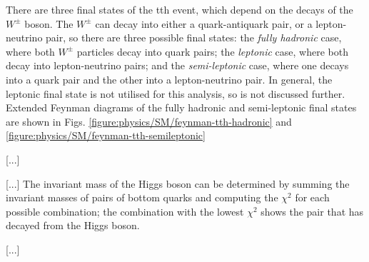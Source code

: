 There are three final states of the tth event, which depend on the decays of the $W^\pm$ boson. The $W^\pm$ can decay into either a quark-antiquark pair, or a lepton-neutrino pair, so there are three possible final states: the \emph{fully hadronic} case, where both $W^\pm$ particles decay into quark pairs; the \emph{leptonic} case, where both decay into lepton-neutrino pairs; and the \emph{semi-leptonic} case, where one decays into a quark pair and the other into a lepton-neutrino pair. In general, the leptonic final state is not utilised for this analysis, so is not discussed further. Extended Feynman diagrams of the fully hadronic and semi-leptonic final states are shown in Figs. \ref{figure:physics/SM/feynman-tth-hadronic} and \ref{figure:physics/SM/feynman-tth-semileptonic}

[...]

[...] The invariant mass of the Higgs boson can be determined by summing the invariant masses of pairs of bottom quarks and computing the $\chi^2$ for each possible combination; the combination with the lowest $\chi^2$ shows the pair that has decayed from the Higgs boson.

[...]

